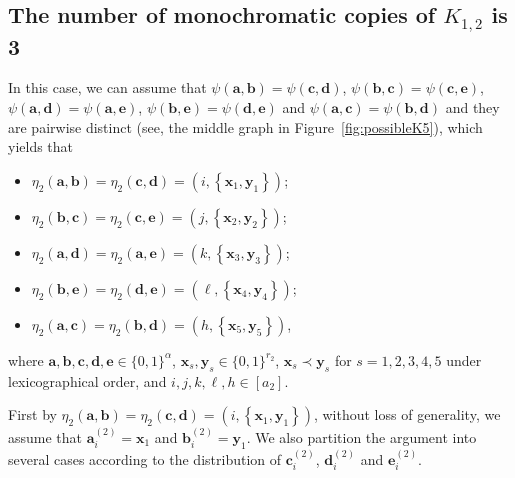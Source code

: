\documentclass[11pt]{article}
\theoremstyle{definition}
\newcommand{\aaa}{\boldsymbol{a}}
\newcommand{\bb}{\boldsymbol{b}}
\newcommand{\cc}{\boldsymbol{c}}
\newcommand{\dd}{\boldsymbol{d}}
\newcommand{\ee}{\boldsymbol{e}}
\begin{document}
\subsection{The number of monochromatic copies of $K_{1,2}$ is 3}\label{subsubsec:star3}
 In this case, we can assume that $\psi(\aaa,\bb)=\psi(\cc,\dd)$, $\psi(\bb,\cc)=\psi(\cc,\ee)$, $\psi(\aaa,\dd)=\psi(\aaa,\ee)$, $\psi(\bb,\ee)=\psi(\dd,\ee)$ and $\psi(\aaa,\cc)=\psi(\bb,\dd)$ and they are pairwise distinct (see, the middle graph in Figure~\ref{fig:possibleK5}), which yields that

\begin{itemize}
    \item $\eta_{2}(\aaa,\bb)=\eta_{2}(\cc,\dd)=(i,\left\{\boldsymbol{x}_{1},\boldsymbol{y}_{1}\right\})$;
    \item $\eta_{2}(\bb,\cc)=\eta_{2}(\cc,\ee)=(j,\left\{\boldsymbol{x}_{2},\boldsymbol{y}_{2}\right\})$;
    \item $\eta_{2}(\aaa,\dd)=\eta_{2}(\aaa,\ee)=(k,\left\{\boldsymbol{x}_{3},\boldsymbol{y}_{3}\right\})$;
    \item $\eta_{2}(\bb,\ee)=\eta_{2}(\dd,\ee)=(\ell,\left\{\boldsymbol{x}_{4},\boldsymbol{y}_{4}\right\})$;
    \item $\eta_{2}(\aaa,\cc)=\eta_{2}(\bb,\dd)=(h,\left\{\boldsymbol{x}_{5},\boldsymbol{y}_{5}\right\})$,
\end{itemize}
where $\boldsymbol{a},\bb,\cc,\dd,\ee\in\{0,1\}^{\alpha}$, $\boldsymbol{x}_{s},\boldsymbol{y}_{s}\in\{0,1\}^{r_{2}}$, $\boldsymbol{x}_{s}\prec\boldsymbol{y}_{s}$ for $s=1,2,3,4,5$ under lexicographical order, and $i,j,k,\ell,h\in [a_{2}]$.

First by $\eta_{2}(\aaa,\bb)=\eta_{2}(\cc,\dd)=(i,\left\{\boldsymbol{x}_{1},\boldsymbol{y}_{1}\right\})$, without loss of generality, we assume that $\aaa_{i}^{(2)}=\boldsymbol{x}_{1}$ and $\bb_{i}^{(2)}=\boldsymbol{y}_{1}$. We also partition the argument into several cases according to the distribution of $\cc_{i}^{(2)}$, $\dd_{i}^{(2)}$ and $\ee_{i}^{(2)}$.
\end{document}
